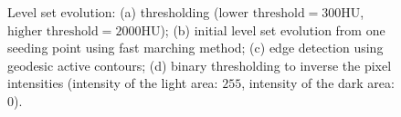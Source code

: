 \begin{figure}[t]
\centering
\hfil
\hfil
\hfil
\caption{Level set evolution: (a) thresholding ($\text{lower threshold} = 300\text{HU}$, $\text{higher threshold} = 2000\text{HU}$); (b) initial level set evolution from one seeding point using fast marching method; (c) edge detection using geodesic active contours; (d) binary thresholding to inverse the pixel intensities (intensity of the light area: $255$, intensity of the dark area: $0$).}
\label{fig:LevelSetEvolution}
\end{figure}

